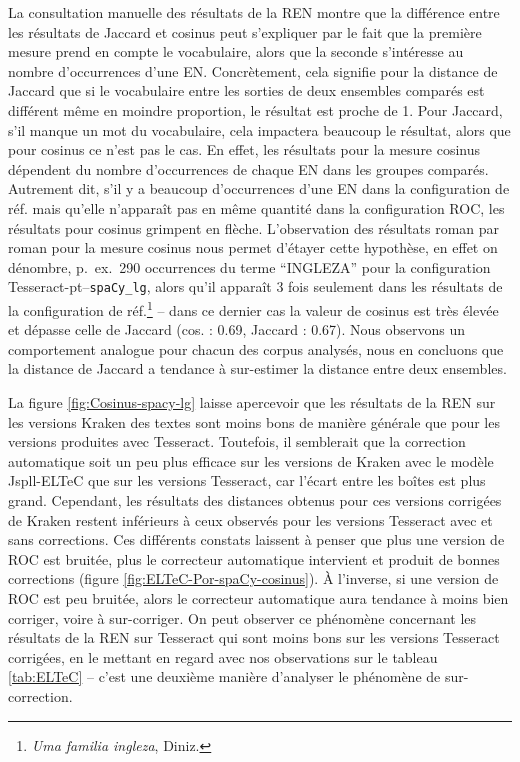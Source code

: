 La consultation manuelle des résultats de la REN montre que la différence entre les résultats de Jaccard et cosinus peut s'expliquer par le fait que la première mesure prend en compte le vocabulaire, alors que la seconde s'intéresse au nombre d'occurrences d'une EN. Concrètement, cela signifie pour la distance de Jaccard que si le vocabulaire entre les sorties de deux ensembles comparés est différent même en moindre proportion, le résultat est proche de 1. Pour Jaccard, s'il manque un mot du vocabulaire, cela impactera beaucoup le résultat, alors que pour cosinus ce n'est pas le cas.
En effet, les résultats pour la mesure cosinus dépendent du nombre d'occurrences de chaque EN dans les groupes comparés. Autrement dit, s'il y a beaucoup d'occurrences d'une EN dans la configuration de réf. mais qu'elle n'apparaît pas en même quantité dans la configuration ROC, les résultats pour cosinus grimpent en flèche. L'observation des résultats roman par roman pour la mesure cosinus nous permet d'étayer cette hypothèse, en effet on dénombre, p.\ ex.\, 290 occurrences du terme ``INGLEZA'' pour la configuration Tesseract-pt--\texttt{spaCy\_lg}, alors qu'il apparaît 3 fois seulement dans les résultats de la configuration de réf.\footnote{\textit{Uma familia ingleza}, Diniz.} -- dans ce dernier cas la valeur de cosinus est très élevée et dépasse celle de Jaccard (cos. : 0.69, Jaccard : 0.67). Nous observons un comportement analogue pour chacun des corpus analysés, nous en concluons que la distance de Jaccard a tendance à sur-estimer la distance entre deux ensembles.

La figure \ref{fig:Cosinus-spacy-lg} laisse apercevoir que les résultats de la REN sur les versions Kraken des textes sont moins bons de manière générale que pour les versions produites avec Tesseract. Toutefois, il semblerait que la correction automatique soit un peu plus efficace sur les versions de Kraken avec le modèle Jspll-ELTeC que sur les versions Tesseract, car l'écart entre les boîtes est plus grand. Cependant, les résultats des distances obtenus pour ces versions corrigées de Kraken restent inférieurs à ceux observés pour les versions Tesseract avec et sans corrections. Ces différents constats laissent à penser que plus une version de ROC est bruitée, plus le correcteur automatique intervient et produit de bonnes corrections (figure \ref{fig:ELTeC-Por-spaCy-cosinus}). À l'inverse, si une version de ROC est peu bruitée, alors le correcteur automatique aura tendance à moins bien corriger, voire à sur-corriger. On peut observer ce phénomène concernant les résultats de la REN sur Tesseract qui sont moins bons sur les versions Tesseract corrigées, en le mettant en regard avec nos observations sur le tableau \ref{tab:ELTeC} -- c'est une deuxième manière d'analyser le phénomène de sur-correction. 

